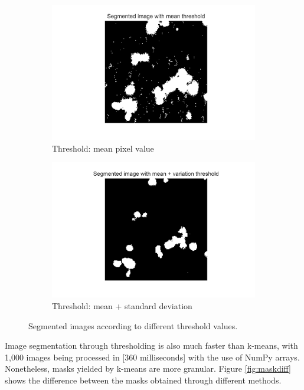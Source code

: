 \begin{figure}[h]
    \centering
    \begin{subfigure}[h!]{0.4\textwidth}
        \includegraphics[width=\textwidth]{dissertation/figures/mean_threshold_cell.jpg}
        \caption{Threshold: mean pixel value}
        \label{fig:thresholdmean}
    \end{subfigure}
    \begin{subfigure}[h!]{0.4\textwidth}
        \includegraphics[width=\textwidth]{dissertation/figures/mean_std_threshold_cell.jpg}
        \caption{Threshold: mean + standard deviation}
        \label{fig:thresholdstd}
    \end{subfigure}
    \caption{Segmented images according to different threshold values.}
\end{figure}

Image segmentation through thresholding is also much faster than k-means, with 1,000 images being processed in [360 milliseconds] with the use of NumPy arrays. Nonetheless, masks yielded by k-means are more granular. Figure \ref{fig:maskdiff} shows the difference between the masks obtained through different methods.

